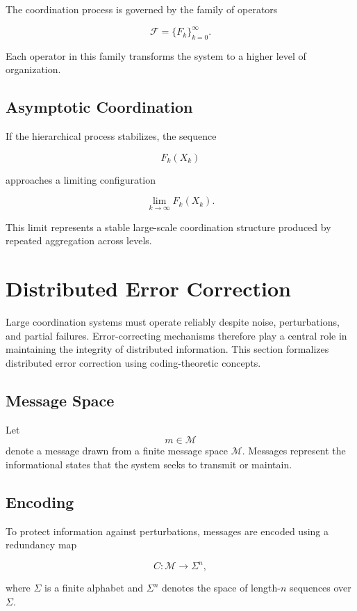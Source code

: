 \documentclass[12pt]{article}
\begin{document}
The coordination process is governed by the family of operators

\[
\mathcal{F} = \{F_k\}_{k=0}^{\infty}.
\]

Each operator in this family transforms the system to a higher level of organization.

\subsection{Asymptotic Coordination}

If the hierarchical process stabilizes, the sequence

\[
F_k(X_k)
\]

approaches a limiting configuration

\[
\lim_{k \to \infty} F_k(X_k).
\]

This limit represents a stable large-scale coordination structure produced by repeated aggregation across levels.

\section{Distributed Error Correction}

Large coordination systems must operate reliably despite noise, perturbations, and partial failures. Error-correcting mechanisms therefore play a central role in maintaining the integrity of distributed information. This section formalizes distributed error correction using coding-theoretic concepts.

\subsection{Message Space}

Let
\[
m \in \mathcal{M}
\]
denote a message drawn from a finite message space $\mathcal{M}$. Messages represent the informational states that the system seeks to transmit or maintain.

\subsection{Encoding}

To protect information against perturbations, messages are encoded using a redundancy map

\[
C : \mathcal{M} \rightarrow \Sigma^n,
\]

where $\Sigma$ is a finite alphabet and $\Sigma^n$ denotes the space of length-$n$ sequences over $\Sigma$.
\end{document}
